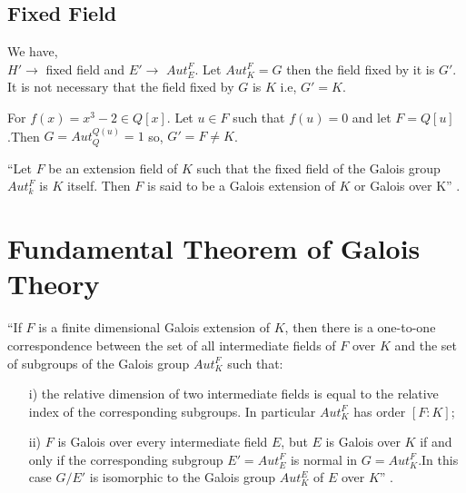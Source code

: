 \subsection{Fixed Field}
We have,\\
\(H' \rightarrow\) fixed field and \(E' \rightarrow\) \(Aut_E^F\).\hspace{5mm} Let \(Aut_K^F = G\) then the field fixed by it is \(G'\). It is not necessary that the field fixed by \(G\) is \(K\) i.e, \(G'=K\).
\vspace{3mm}
\begin{example}
  For \(f(x)=x^3-2 \in Q[x]\). Let \(u \in F\) such that \(f(u)=0\) and let \(F=Q[u]\).Then
  \(G=Aut_Q^{Q(u)}={1}\) so, \hspace{5mm}\(G'=F \neq K\).
\end{example}

\vspace{3mm}
\begin{definition}
``Let \(F\) be an extension field of \(K\) such that the fixed field of the Galois group \(Aut_k^F\) is \(K\) itself. Then \(F\) is said to be a Galois extension of \(K\) or Galois over K'' \cite{hunger}.
\end{definition}

\section{Fundamental Theorem of Galois Theory}
\begin{tcolorbox}
\begin{theorem}
  ``If \(F\) is a finite dimensional Galois extension of \(K\), then there is a one-to-one correspondence between the set of all intermediate fields of \(F\) over \(K\) and the set of subgroups of the Galois group \(Aut_K^F\) such that:
  \begin{enumerate}
  \item[i)] the relative dimension of two intermediate fields is equal to the relative index of the corresponding subgroups. In particular \(Aut_K^F\) has order \([F:K]\);
  \item[ii)] \(F\) is Galois over every intermediate field \(E\), but \(E\) is Galois over \(K\) if and only if the corresponding subgroup \(E'= Aut_E^F\) is normal in \(G=Aut_K^F\).In this case \(G/E'\) is isomorphic to the Galois group \(Aut_K^E\) of \(E\) over \(K\)'' \cite{hunger}.
  \end{enumerate}
\end{theorem}
\end{tcolorbox}

